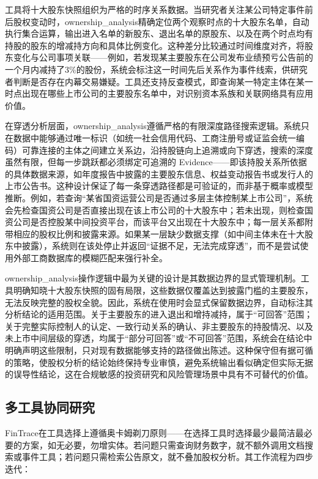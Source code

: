 工具将十大股东快照组织为严格的时序关系数据。当研究者关注某公司特定事件前后股权变动时，ownership\_analysis精确定位两个观察时点的十大股东名单，自动执行集合运算，输出进入名单的新股东、退出名单的原股东、以及在两个时点均有持股的股东的增减持方向和具体比例变化。这种差分比较通过时间维度对齐，将股东变化与公司事项关联——例如，若发现某主要股东在公司发布业绩预亏公告前的一个月内减持了3\%的股份，系统会标注这一时间先后关系作为事件线索，供研究者判断是否存在内幕交易嫌疑。工具还支持反查模式，即查询某一特定主体在某一时点出现在哪些上市公司的主要股东名单中，对识别资本系族和关联网络具有应用价值。

在穿透分析层面，ownership\_analysis遵循严格的有限深度路径搜索逻辑。系统只在数据中能够通过唯一标识（如统一社会信用代码、工商注册号或证监会统一编码）可靠连接的主体之间建立关系边，沿持股链向上追溯或向下穿透，搜索的深度虽然有限，但每一步跳跃都必须绑定可追溯的 Evidence——即该持股关系所依据的具体数据来源，如年度报告中披露的主要股东信息、权益变动报告书或发行人的上市公告书。这种设计保证了每一条穿透路径都是可验证的，而非基于概率或模型推断。例如，若查询“某省国资运营公司是否通过多层主体控制某上市公司”，系统会先检查国资公司是否直接出现在该上市公司的十大股东中；若未出现，则检查国资公司是否控股某中间投资平台，而该平台又出现在十大股东中；每一层关系都附带相应的股权比例和披露来源。如果某一层缺少数据支撑（如中间主体未在十大股东中披露），系统则在该处停止并返回“证据不足，无法完成穿透”，而不是尝试使用外部工商数据库的模糊匹配来强行补全。

ownership\_analysis操作逻辑中最为关键的设计是其数据边界的显式管理机制。工具明确知晓十大股东快照的固有局限，这些数据仅覆盖达到披露门槛的主要股东，无法反映完整的股权全貌。因此，系统在使用时会显式保留数据边界，自动标注其分析结论的适用范围。关于主要股东的进入退出和增持减持，属于“可回答”范围；关于完整实际控制人的认定、一致行动关系的确认、非主要股东的持股情况、以及未上市中间层级的穿透，均属于“部分可回答”或“不可回答”范围，系统会在结论中明确声明这些限制，只对现有数据能够支持的路径做出陈述。这种保守但有据可循的策略，使股权分析的结论始终保持专业审慎，避免系统输出看似确定但实际无据的误导性结论，这在合规敏感的投资研究和风险管理场景中具有不可替代的价值。

\subsection{多工具协同研究}

FinTrace在工具选择上遵循奥卡姆剃刀原则——在选择工具时选择最少最简洁最必要的方案，如无必要，勿增实体。若问题只需查询财务数字，就不额外调用文档搜索或事件工具；若问题只需检索公告原文，就不叠加股权分析。其工作流程为四步迭代：

